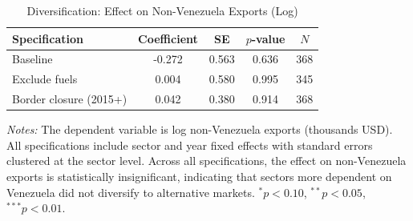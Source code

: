 \begin{table}[!htbp]
\centering
\begin{threeparttable}
\caption{Diversification: Effect on Non-Venezuela Exports (Log)}
\label{tab:diversification}
\small
\begin{tabular}{lcccc}
\toprule
Specification & Coefficient & SE & $p$-value & $N$ \\
\midrule
Baseline & -0.272 & 0.563 & 0.636 & 368 \\
Exclude fuels & 0.004 & 0.580 & 0.995 & 345 \\
Border closure (2015+) & 0.042 & 0.380 & 0.914 & 368 \\
\bottomrule
\end{tabular}
\begin{tablenotes}[flushleft]\footnotesize
\item \textit{Notes:} The dependent variable is log non-Venezuela exports (thousands USD). All specifications include sector and year fixed effects with standard errors clustered at the sector level. Across all specifications, the effect on non-Venezuela exports is statistically insignificant, indicating that sectors more dependent on Venezuela did not diversify to alternative markets. $^{*}p<0.10$, $^{**}p<0.05$, $^{***}p<0.01$.
\end{tablenotes}
\end{threeparttable}
\end{table}

